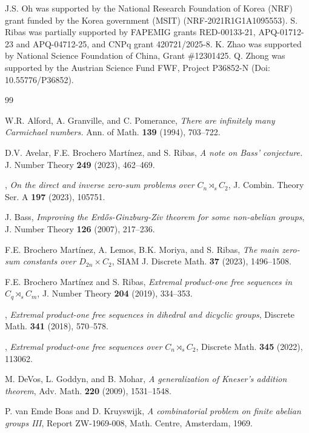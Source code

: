 \documentclass[leqno,a4paper]{amsart}
\theoremstyle{plain}
\theoremstyle{definition}
\numberwithin{equation}{section}
\begin{document}
    J.S. Oh was supported by the National Research Foundation of Korea (NRF) grant funded by the Korea government (MSIT) (NRF-2021R1G1A1095553).
	S. Ribas was partially supported by FAPEMIG grants RED-00133-21, APQ-01712-23 and APQ-04712-25, and CNPq grant 420721/2025-8. K. Zhao  was supported  by National Science Foundation
	of China, Grant \#12301425. Q. Zhong was supported by the Austrian Science Fund FWF, Project P36852-N (Doi: 10.55776/P36852).
	
	
	


    \smallskip
	\begin{thebibliography}{99}
		
		W.R. Alford, A. Granville, and C. Pomerance,
		{\em There are infinitely many Carmichael
		numbers.}
		Ann. of Math. \textbf{139} (1994), 703--722.
		
		D.V. Avelar, F.E. Brochero Martínez, and S. Ribas,
		{\em A note on Bass' conjecture.}
		J. Number Theory \textbf{249} (2023), 462--469.
		
		\bysame,
		{\em On the direct and inverse zero-sum problems over $C_n \rtimes_s C_2$},
		J. Combin. Theory Ser. A \textbf{197} (2023), 105751.
				
		J. Bass,
		{\em Improving the Erd\H{o}s-Ginzburg-Ziv theorem for some non-abelian groups},
		J. Number Theory \textbf{126} (2007), 217--236.
		
		F.E. Brochero Martínez, A. Lemos, B.K. Moriya, and S. Ribas,
		{\em The main zero-sum constants over $D_{2n} \times C_2$},
		SIAM J. Discrete Math. \textbf{37} (2023), 1496--1508.
		
		F.E. Brochero Martínez and S. Ribas,
		{\em Extremal product-one free sequences in $C_q \rtimes_s C_m$},
		J. Number Theory \textbf{204} (2019), 334--353.
		
		\bysame,
		{\em Extremal product-one free sequences in dihedral and dicyclic groups},
		Discrete Math. \textbf{341} (2018), 570--578.
		
		\bysame,
		{\em Extremal product-one free sequences over $C_n \rtimes_s C_2$},
		Discrete Math. \textbf{345} (2022), 113062.
		
		M. DeVos, L. Goddyn, and B. Mohar,
		{\em A generalization of Kneser's addition theorem},
		Adv. Math. \textbf{220} (2009), 1531--1548.
		
		P. van Emde Boas and D. Kruyswijk,
		{\em A combinatorial problem on finite abelian groups III},
		Report ZW-1969-008, Math. Centre, Amsterdam, 1969.


\end{thebibliography}
\end{document}
